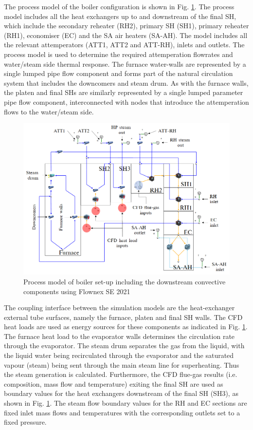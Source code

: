 \documentclass[11pt,cleanfoot]{asme2ej}
\begin{document}
The process model of the boiler configuration is shown in Fig. \ref{fig_flownex}. The process model includes all the heat exchangers up to and downstream of the final SH, which include the secondary reheater (RH2), primary SH (SH1), primary reheater (RH1), economiser (EC) and the SA air heaters (SA-AH). The model includes all the relevant attemperators (ATT1, ATT2 and ATT-RH), inlets and outlets. The process model is used to determine the required attemperation flowrates and water/steam side thermal response. The furnace water-walls are represented by a single lumped pipe flow component and forms part of the natural circulation system that includes the downcomers and steam drum. As with the furnace walls, the platen and final SHs are similarly represented by a single lumped parameter pipe flow component, interconnected with nodes that introduce the attemperation flows to the water/steam side.
\begin{figure}[h!]
\centering
\includegraphics[scale=0.5]{FLOWNEX_SETUP}
\caption{Process model of boiler set-up including the downstream convective components using Flownex SE 2021}
\label{fig_flownex}
\end{figure}

The coupling interface between the simulation models are the heat-exchanger external tube surfaces, namely the furnace, platen and final SH walls. The CFD heat loads are used as energy sources for these components as indicated in Fig. \ref{fig_flownex}. The furnace heat load to the evaporator walls determines the circulation rate through the evaporator. The steam drum separates the gas from the liquid, with the liquid water being recirculated through the evaporator and the saturated vapour (steam) being sent through the main steam line for superheating. Thus the steam generation is calculated. Furthermore, the CFD flue-gas results (i.e. composition, mass flow and temperature) exiting the final SH are used as boundary values for the heat exchangers downstream of the final SH (SH3), as shown in Fig. \ref{fig_flownex}. The steam flow boundary values for the RH and EC sections are fixed inlet mass flows and temperatures with the corresponding outlets set to a fixed pressure.
\end{document}
